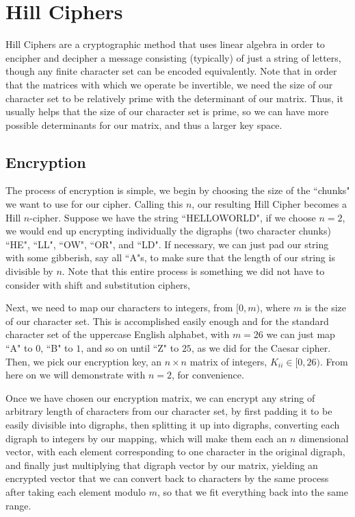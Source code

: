 \documentclass{article}
\begin{document}
\section{Hill Ciphers}
Hill Ciphers are a cryptographic method that uses linear algebra in order to encipher and decipher a message consisting (typically) of just a string of letters, though any finite character set can be encoded equivalently. Note that in order that the matrices with which we operate be invertible, we need the size of our character set to be relatively prime with the determinant of our matrix. Thus, it usually helps that the size of our character set is prime, so we can have more possible determinants for our matrix, and thus a larger key space.

\subsection{Encryption}
The process of encryption is simple, we begin by choosing the size of the ``chunks" we want to use for our cipher. Calling this $n$, our resulting Hill Cipher becomes a Hill $n$-cipher. Suppose we have the string ``HELLOWORLD", if we choose $n = 2$, we would end up encrypting individually the digraphs (two character chunks) ``HE", ``LL", ``OW", ``OR", and ``LD". If necessary, we can just pad our string with some gibberish, say all ``A"s, to make sure that the length of our string is divisible by $n$. Note that this entire process is something we did not have to consider with shift and substitution ciphers,  \medskip

\noindent Next, we need to map our characters to integers, from $[0, m)$, where $m$ is the size of our character set. This is accomplished easily enough and for the standard character set of the uppercase English alphabet, with $m = 26$ we can just map ``A" to $0$, ``B" to $1$, and so on until ``Z" to $25$, as we did for the Caesar cipher. Then, we pick our encryption key, an $n \times n$ matrix of integers, $K_{ii} \in [0, 26)$. From here on we will demonstrate with $n = 2$, for convenience. \medskip

\noindent Once we have chosen our encryption matrix, we can encrypt any string of arbitrary length of characters from our character set, by first padding it to be easily divisible into digraphs, then splitting it up into digraphs, converting each digraph to integers by our mapping, which will make them each an $n$ dimensional vector, with each element corresponding to one character in the original digraph, and finally just multiplying that digraph vector by our matrix, yielding an encrypted vector that we can convert back to characters by the same process after taking each element modulo $m$, so that we fit everything back into the same range. \medskip
\end{document}

